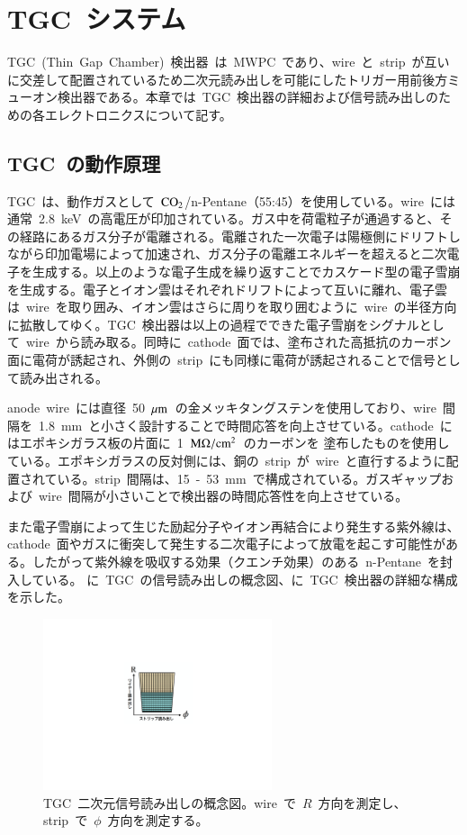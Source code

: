 \chapter{TGC~システム}
\thispagestyle{empty}
\label{chap:4}
TGC~(Thin~Gap~Chamber)~検出器~\cite{TR:04}は~MWPC~であり、wire~と~strip~が互いに交差して配置されているため二次元読み出しを可能にしたトリガー用前後方ミューオン検出器である。本章では~TGC~検出器の詳細および信号読み出しのための各エレクトロニクスについて記す。
\section{TGC~の動作原理}
TGC~は、動作ガスとして~$\rm{CO_2}$/n-Pentane（55:45）を使用している。wire~には通常~2.8~keV~の高電圧が印加されている。ガス中を荷電粒子が通過すると、その経路にあるガス分子が電離される。電離された一次電子は陽極側にドリフトしながら印加電場によって加速され、ガス分子の電離エネルギーを超えると二次電子を生成する。以上のような電子生成を繰り返すことでカスケード型の電子雪崩を生成する。電子とイオン雲はそれぞれドリフトによって互いに離れ、電子雲は~wire~を取り囲み、イオン雲はさらに周りを取り囲むように~wire~の半径方向に拡散してゆく。TGC~検出器は以上の過程でできた電子雪崩をシグナルとして~wire~から読み取る。同時に~cathode~面では、塗布された高抵抗のカーボン面に電荷が誘起され、外側の~strip~にも同様に電荷が誘起されることで信号として読み出される。

anode~wire~には直径~50~$\mu\rm{m}$~の金メッキタングステンを使用しており、wire~間隔を~1.8~mm~と小さく設計することで時間応答を向上させている。cathode~にはエポキシガラス板の片面に~1~$\rm{M}\Omega/\rm{cm}^2$~のカーボンを
塗布したものを使用している。エポキシガラスの反対側には、銅の~strip~が~wire~と直行するように配置されている。strip~間隔は、15~-~53~mm~で構成されている。ガスギャップおよび~wire~間隔が小さいことで検出器の時間応答性を向上させている。

また電子雪崩によって生じた励起分子やイオン再結合により発生する紫外線は、cathode~面やガスに衝突して発生する二次電子によって放電を起こす可能性がある。したがって紫外線を吸収する効果（クエンチ効果）のある~n-Pentane~を封入している。
に~TGC~の信号読み出しの概念図、に~TGC~検出器の詳細な構成を示した。

\begin{figure}[H]
        \centering   
        \includegraphics[width=0.6\textwidth,page=1]{img/pdf/tgc2d.pdf}
        \caption[TGC~二次元信号読み出しの概念図]{TGC~二次元信号読み出しの概念図。wire~で~$R$~方向を測定し、strip~で~$\phi$~方向を測定する。}\label{fig:tgc2d}
\end{figure}

